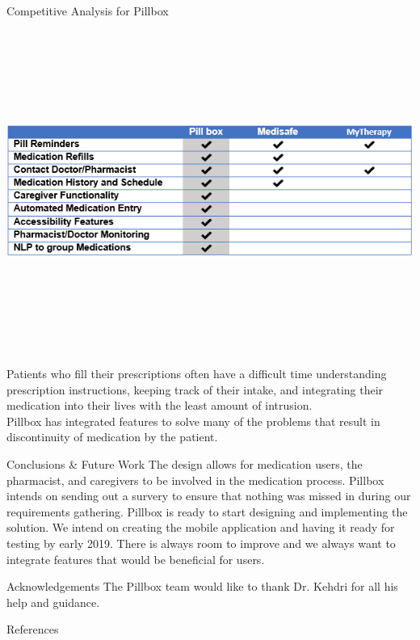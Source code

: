\documentclass[22pt]{beamer}
\begin{document}
\begin{frame}[fragile]
\begin{textblock}{7.25}
\begin{block}{Competitive Analysis for Pillbox}
\begin{center}
\includegraphics[height=10.5cm]{CompetitiveAdvantage.png}
\end{center}
Patients who fill their prescriptions often have a difficult time understanding prescription instructions, keeping track of their intake, and integrating their medication into their lives with the least amount of intrusion.\\
Pillbox has integrated features to solve many of the problems that result in discontinuity of medication by the patient.
\end{block}


\begin{block}{Conclusions \& Future Work}
The design allows for medication users, the pharmacist, and caregivers to be involved in the medication process. Pillbox intends on sending out a survery to ensure that nothing was missed in during our requirements gathering. Pillbox is ready to start designing and implementing the solution. We intend on creating the mobile application and having it ready for testing by early 2019. There is always room to improve and we always want to integrate features that would be beneficial for users.

\end{block}

\begin{block}{Acknowledgements}
The Pillbox team would like to thank Dr. Kehdri for all his help and guidance.
\end{block}

\begin{block}{References}

{\scriptsize
}
\end{block}


\end{textblock}
\end{frame}
\end{document}
